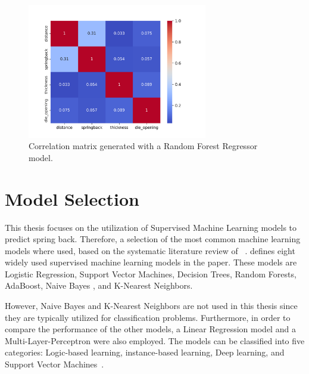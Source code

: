 \begin{figure}[H]
    \begin{tcolorbox}[arc=0pt,boxrule=0.5pt]
        \centering
        \includegraphics[width=0.7\textwidth]{chap4/images/correlation_matrix}
    \end{tcolorbox}
    \caption{Correlation matrix generated with a Random Forest Regressor model.}
    \label{fig:correlation_matrix}
\end{figure}


\section{Model Selection}\label{sec:model-selection}
This thesis focuses on the utilization of Supervised Machine Learning models to predict
spring back.
Therefore, a selection of the most common machine learning models where used, based on
the systematic literature review of
~\cite{dridi2021supervised}.
\cite{dridi2021supervised} defines eight widely used supervised machine learning models in the paper.
These models are Logistic Regression, Support Vector Machines, Decision Trees, Random Forests, AdaBoost, Naive Bayes
, and K-Nearest Neighbors.

However, Naive Bayes and K-Nearest Neighbors are not used in this thesis since they are typically
utilized for classification problems.
Furthermore, in order to compare the performance of the other models, a Linear Regression model
and a Multi-Layer-Perceptron were also employed.
The models can be classified into five categories: Logic-based learning, instance-based learning, Deep learning, and
Support Vector Machines~\cite[p. 8]{dridi2021supervised}.

